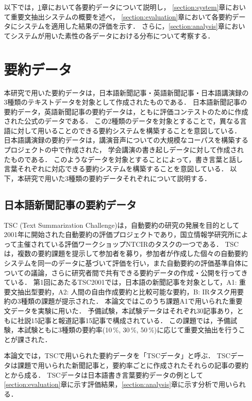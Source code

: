 以下では，\ref{section:data}章において各要約データについて説明し，
\ref{section:system}章において重要文抽出システムの概要を述べ，
\ref{section:evaluation}章において各要約データにシステムを適用した結果の評価を示す．
さらに，\ref{section:analysis}章においてシステムが用いた素性の各データにおける分布について考察する．

\section{要約データ}
\label{section:data}

本研究で用いた要約データは，日本語新聞記事・英語新聞記事・日本語講演録の3種類のテキストデータを対象として作成されたものである．
日本語新聞記事の要約データ，英語新聞記事の要約データは，ともに評価コンテストのために作成された公式のデータである．
この2種類のデータを対象とすることで，異なる言語に対して用いることのできる要約システムを構築することを意図している．
日本語講演録の要約データは，講演音声についての大規模なコーパスを構築するプロジェクトの中で作成された，
学会講演の書き起しデータに対して作成されたものである．
このようなデータを対象とすることによって，書き言葉と話し言葉それぞれに対応できる要約システムを構築することを意図している．
以下，本研究で用いた3種類の要約データそれぞれについて説明する．

\subsection{日本語新聞記事の要約データ}
\label{section:data_tsc}

TSC (Text Summarization Challenge)は，自動要約の研究の発展を目的として2001年に開始された自動要約の評価プロジェクトであり，国立情報学研究所によって主催されている評価ワークショップNTCIRのタスクの一つである\cite{TSC1}．
TSCは，複数の要約課題を提示して参加者を募り，参加者が作成した個々の自動要約システムを同一のデータに基づいて評価を行い，また自動要約の評価基準自体についての議論，さらに研究者間で共有できる要約データの作成・公開を行ってきている．
第1回にあたるTSC2001では，日本語の新聞記事を対象として，A1: 重要文抽出型要約，A2: 人間の自由作成要約と比較可能な要約，B: IRタスク用要約の3種類の課題が提示された．
本論文ではこのうち課題A1で用いられた重要文データを実験に用いた．
予備試験，本試験データはそれぞれ30記事あり，ともに社説15記事と報道記事15記事で構成されている．
この課題では，予備試験，本試験ともに3種類の要約率(10\,\%, 30\,\%, 50\,\%)に応じて重要文抽出を行うことが課された．

本論文では，TSCで用いられた要約データを「TSCデータ」と呼ぶ．
TSCデータは課題で用いられた新聞記事と，要約率ごとに作成されたそれらの記事の要約とから成る．
TSCデータは日本語書き言葉要約データの例として\ref{section:evaluation}章に示す評価結果，\ref{section:analysis}章に示す分析で用いられる．

